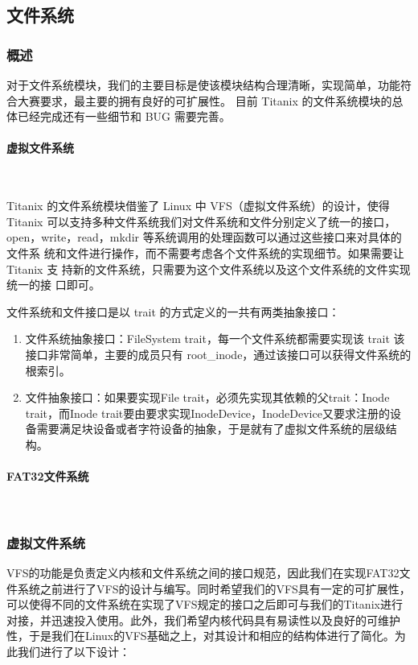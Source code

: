 \subsection{文件系统}

\subsubsection{概述}

对于文件系统模块，我们的主要目标是使该模块结构合理清晰，实现简单，功能符合大赛要求，最主要的拥有良好的可扩展性。
目前 Titanix 的文件系统模块的总体已经完成还有一些细节和 BUG 需要完善。

\paragraph{虚拟文件系统}~{}

Titanix 的文件系统模块借鉴了 Linux 中 VFS（虚拟文件系统）的设计，使得
Titanix 可以支持多种文件系统我们对文件系统和文件分别定义了统一的接口，
open，write，read，mkdir 等系统调用的处理函数可以通过这些接口来对具体的文件系
统和文件进行操作，而不需要考虑各个文件系统的实现细节。如果需要让 Titanix 支
持新的文件系统，只需要为这个文件系统以及这个文件系统的文件实现统一的接
口即可。

文件系统和文件接口是以 trait 的方式定义的一共有两类抽象接口：

\begin{enumerate}
    \item 文件系统抽象接口：FileSystem trait，每一个文件系统都需要实现该 trait 该接口非常简单，主要的成员只有 root\_inode，通过该接口可以获得文件系统的根索引。
    \item 文件抽象接口：如果要实现File trait，必须先实现其依赖的父trait：Inode trait，而Inode trait要由要求实现InodeDevice，InodeDevice又要求注册的设备需要满足块设备或者字符设备的抽象，于是就有了虚拟文件系统的层级结构。
\end{enumerate}

\paragraph{FAT32文件系统}~{}

\subsubsection{虚拟文件系统}

VFS的功能是负责定义内核和文件系统之间的接口规范，因此我们在实现FAT32文件系统之前进行了VFS的设计与编写。同时希望我们的VFS具有一定的可扩展性，可以使得不同的文件系统在实现了VFS规定的接口之后即可与我们的Titanix进行对接，并迅速投入使用。此外，我们希望内核代码具有易读性以及良好的可维护性，于是我们在Linux的VFS基础之上，对其设计和相应的结构体进行了简化。为此我们进行了以下设计：

